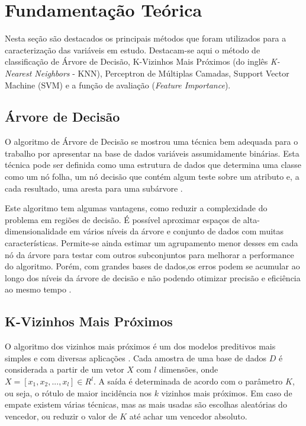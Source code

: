 \documentclass{template/sig-alternate-05-2015}
\begin{document}
      \section{Fundamentação Teórica}

      Nesta seção são destacados os principais métodos que foram
      utilizados para a caracterização das variáveis em
      estudo. Destacam-se aqui o método de classificação de Árvore de
      Decisão, K-Vizinhos Mais Próximos (do inglês \textit{K-Nearest
        Neighbors} - KNN), Perceptron de Múltiplas Camadas, Support
      Vector Machine (SVM) e a função de avaliação (\textit{Feature
        Importance}).


      \subsection{Árvore de Decisão}

      O algoritmo de Árvore de Decisão se mostrou uma técnica bem
      adequada para o trabalho por apresentar na base de dados
      variáveis assumidamente binárias. Esta técnica pode ser definida
      como uma estrutura de dados que determina uma classe como um nó
      folha, um nó decisão que contém algum teste sobre um atributo e,
      a cada resultado, uma aresta para uma subárvore
      \cite{Rezende1999}.

      Este algoritmo tem algumas vantagens, como reduzir a
      complexidade do problema em regiões de decisão. É possível
      aproximar espaços de alta-dimensionalidade em vários níveis da
      árvore e conjunto de dados com muitas
      características. Permite-se ainda estimar um agrupamento menor
      desses em cada nó da árvore para testar com outros subconjuntos
      para melhorar a performance do algoritmo. Porém, com grandes
      bases de dados,os erros podem se acumular ao longo dos níveis da
      árvore de decisão e não podendo otimizar precisão e eficiência
      ao mesmo tempo \cite{IEEE}.

      \subsection{K-Vizinhos Mais Próximos}

      O algoritmo dos vizinhos mais próximos é um dos modelos
      preditivos mais simples e com diversas aplicações
      \cite{Dutta:2017,joel,Halibas:2018}. Cada amostra de uma base de
      dados $D$ é considerada a partir de um vetor $X$ com $l$
      dimensões, onde $X = [x_{1}, x_{2}, ...,x_{l}] \in R^{l}$. A saída
      é determinada de acordo com o parâmetro $K$, ou seja, o rótulo
      de maior incidência nos $k$ vizinhos mais próximos. Em caso de
      empate existem várias técnicas, mas as mais usadas são escolhas
      aleatórias do vencedor, ou reduzir o valor de $K$ até achar um
      vencedor absoluto.
\end{document}
